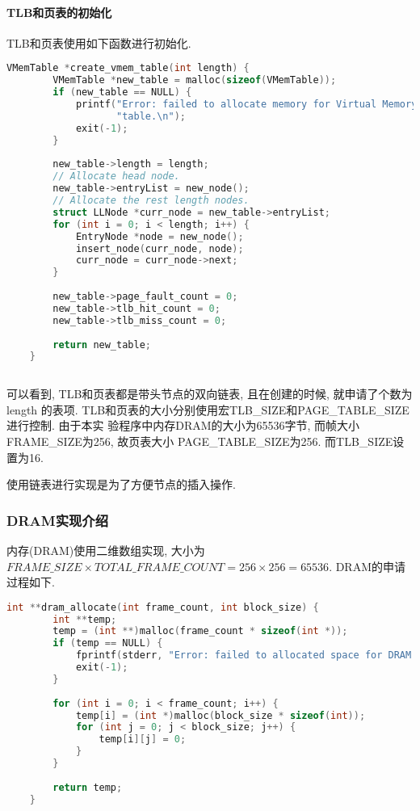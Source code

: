 \paragraph{TLB和页表的初始化}
TLB和页表使用如下函数进行初始化.
\begin{lstlisting}[language=c++]
    VMemTable *create_vmem_table(int length) {
        VMemTable *new_table = malloc(sizeof(VMemTable));
        if (new_table == NULL) {
            printf("Error: failed to allocate memory for Virtual Memory Addressing "
                   "table.\n");
            exit(-1);
        }
    
        new_table->length = length;
        // Allocate head node.
        new_table->entryList = new_node();
        // Allocate the rest length nodes.
        struct LLNode *curr_node = new_table->entryList;
        for (int i = 0; i < length; i++) {
            EntryNode *node = new_node();
            insert_node(curr_node, node);
            curr_node = curr_node->next;
        }
    
        new_table->page_fault_count = 0;
        new_table->tlb_hit_count = 0;
        new_table->tlb_miss_count = 0;
    
        return new_table;
    }
    
\end{lstlisting}
可以看到, TLB和页表都是带头节点的双向链表, 且在创建的时候, 就申请了个数为length
的表项. TLB和页表的大小分别使用宏TLB\_SIZE和PAGE\_TABLE\_SIZE进行控制. 由于本实
验程序中内存DRAM的大小为65536字节, 而帧大小FRAME\_SIZE为256, 故页表大小
PAGE\_TABLE\_SIZE为256. 而TLB\_SIZE设置为16.

使用链表进行实现是为了方便节点的插入操作.

\subsubsection{DRAM实现介绍}
内存(DRAM)使用二维数组实现, 大小为$FRAME\_SIZE\times TOTAL\_FRAME\_COUNT =
    256\times 256 = 65536$. DRAM的申请过程如下.
\begin{lstlisting}[language=c++]
    int **dram_allocate(int frame_count, int block_size) {
        int **temp;
        temp = (int **)malloc(frame_count * sizeof(int *));
        if (temp == NULL) {
            fprintf(stderr, "Error: failed to allocated space for DRAM.\n");
            exit(-1);
        }
    
        for (int i = 0; i < frame_count; i++) {
            temp[i] = (int *)malloc(block_size * sizeof(int));
            for (int j = 0; j < block_size; j++) {
                temp[i][j] = 0;
            }
        }
    
        return temp;
    }
    
\end{lstlisting}

